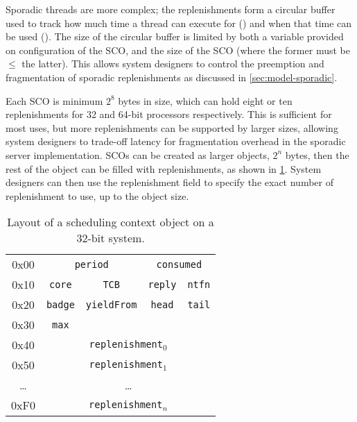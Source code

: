 Sporadic threads are more complex; the replenishments form a circular buffer used to track 
how much time a thread can execute for () and when that time can be used ().
The size of the circular buffer is limited by both a variable
provided on configuration of the \gls{SCO}, and the size of the \gls{SCO} (where the former must be
$\leq$ the latter). This allows system
designers to control the preemption and fragmentation of sporadic replenishments as discussed in
\cref{sec:model-sporadic}. 

Each \gls{SCO} is minimum $2^{8}$ bytes in size, which can hold eight or ten replenishments for 32
and 64-bit processors respectively. This is sufficient for most uses, but more replenishments can
be supported by larger sizes, allowing system designers to trade-off latency for fragmentation
overhead in the sporadic server implementation. \glspl{SCO} can be created as larger
objects, $2^{n}$ bytes, then the rest of the object can be filled with replenishments, as
shown in \cref{t:impl-sc-layout}. System designers can then use the  replenishment field
to specify the exact number of replenishment to use, up to the object size. 

\begin{table}[t] 
    \centering
    \begin{tabular}{c|c|c|c|c|}\cline{2-5}
        0x00 &  \multicolumn{2}{c}{\texttt{period}} & \multicolumn{2}{|c|}{\texttt{consumed}}
        \\\cline{2-5}
        0x10 & \texttt{core}                         & \texttt{TCB} & \texttt{reply} & \texttt{ntfn} \\\cline{2-5}
        0x20 &\texttt{badge}                        & \texttt{yieldFrom}                               & \texttt{head}  & \texttt{tail} \\\cline{2-5}
        0x30 & \texttt{max}                          &                                                  &                & \\\cline{2-5}
        0x40 & \multicolumn{4}{c|}{\texttt{replenishment$_{0}$}}  \\\cline{2-5}
        0x50 & \multicolumn{4}{c|}{\texttt{replenishment$_{1}$}}  \\\cline{2-5}
        \ldots & \multicolumn{4}{c|}{\ldots}  \\\cline{2-5}
        0xF0 & \multicolumn{4}{c|}{\texttt{replenishment$_{n}$}}  \\\cline{2-5}


    \end{tabular}
    \caption[Layout of a scheduling context object.]{Layout of a scheduling context object on a 32-bit system.}
    \label{t:impl-sc-layout}
\end{table}

